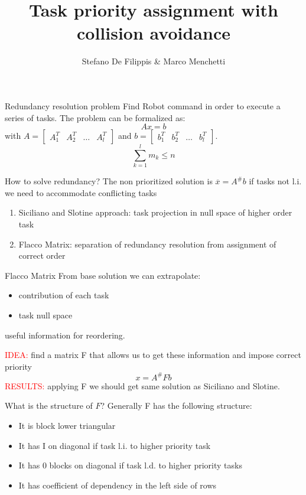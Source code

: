 \documentclass[11pt]{beamer}
\author[Stefano, Marco]{Stefano De Filippis \& Marco Menchetti}
\title[ROB2 project]{Task priority assignment with collision avoidance}
\institute[Sapienza]{Sapienza - University of Rome}
\date{}
\begin{document}
\begin{frame}
\titlepage
\end{frame}

\begin{frame}{Redundancy resolution problem}
Find Robot command in order to execute a series of tasks. The problem can be formalized as:
\[
Ax = b
\]
with $A = \begin{bmatrix}
A_1^T & A_2^T & \dots & A_l^T 
\end{bmatrix}$ and $
b = \begin{bmatrix}
b_1^T & b_2^T & \dots & b_l^T 
\end{bmatrix}
$.
\[
\sum_{k=1}^{l}m_k \leq n
\]
\end{frame}

\begin{frame}{How to solve redundancy?}
The non prioritized solution is $\overline{x} = A^{\#}b$ if tasks not l.i. we need to accommodate conflicting tasks
\begin{enumerate}
\item Siciliano and Slotine approach: task projection in null space of higher order task
\item Flacco Matrix: separation of redundancy resolution from assignment of correct order
\end{enumerate}
\end{frame}

\begin{frame}{Flacco Matrix}
From base solution we can extrapolate:
\begin{itemize}
\item contribution of each task
\item task null space
\end{itemize}
useful information for reordering.

\textcolor{red}{IDEA:} find a matrix F that allows us to get these information and impose correct priority
\[
x = A^{\#}Fb
\]
\textcolor{red}{RESULTS:} applying F we should get same solution as Siciliano and Slotine.
\end{frame}

\begin{frame}{What is the structure of $F$?}
Generally F has the following structure:
\begin{itemize}
\item It is block lower triangular
\item It has I on diagonal if task l.i. to higher priority task
\item It has 0 blocks on diagonal if task l.d. to higher priority tasks
\item It has coefficient of dependency in the left side of rows
\end{itemize}
\end{frame}
\end{document}
